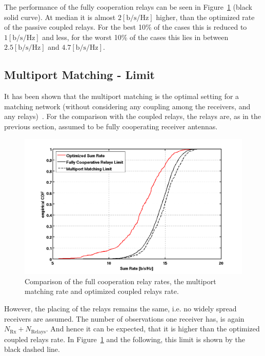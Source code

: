 The performance of the fully cooperation relays can be seen in Figure~\ref{fig:limcomparison} (black solid curve).
At median it is almost $2 \left[\text{b/s/Hz}\right]$ higher, than the optimized rate of the passive coupled relays.
For the best 10\% of the cases this is reduced to $1 \left[\text{b/s/Hz}\right]$ and less,
for the worst 10\% of the cases this lies in between  $2.5 \left[\text{b/s/Hz}\right]$ and $4.7 \left[\text{b/s/Hz}\right]$.


\subsection{Multiport Matching - Limit}
\label{sec:mp_limit}
It has been shown that the multiport matching is the optimal setting for a matching network (without considering any coupling among the receivers, and any relays)~\cite{Nossek}.
For the comparison with the coupled relays, the relays are, as in the previous section, assumed to be fully cooperating receiver antennas.
\begin{figure}[h]
\centering
  \includegraphics[width=0.9\linewidth]{images/Limitcomparison.png}
\caption{Comparison of the full cooperation relay rates, the multiport matching rate and optimized coupled relays rate.}
\label{fig:limcomparison}
\end{figure}
However, the placing of the relays remains the same, i.e. no widely spread receivers are assumed.
The number of observations one receiver has, is again $N_\text{Rx} + N_\text{Relays}$.
And hence it can be expected, that it is higher than the optimized coupled relays rate.
In Figure~\ref{fig:limcomparison} and the following, this limit is shown by the black dashed line.

